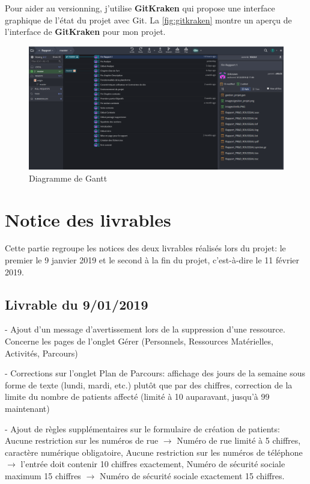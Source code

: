 \documentclass[noposter]{polytech/polytech}
\begin{document}
Pour aider au versionning, j'utilise \textbf{GitKraken} qui propose une interface graphique de l'état du projet avec Git. La \autoref{fig:gitkraken} montre un aperçu de l'interface de \textbf{GitKraken} pour mon projet.

\begin{figure}
	\includegraphics[scale=0.37]{images/gitkraken}
	\caption{Diagramme de Gantt}
	\label{fig:gitkraken}
\end{figure}

\chapter{Notice des livrables}

Cette partie regroupe les notices des deux livrables réalisés lors du projet: le premier le 9 janvier 2019 et le second à la fin du projet, c'est-à-dire le 11 février 2019.


\section{Livrable du 9/01/2019}

- Ajout d'un message d'avertissement lors de la suppression d'une ressource. Concerne les pages de l'onglet Gérer (Personnels, Ressources Matérielles, Activités, Parcours)

- Corrections sur l'onglet Plan de Parcours: affichage des jours de la semaine sous forme de texte (lundi, mardi, etc.) plutôt que par des chiffres, correction de la limite du nombre de patients affecté (limité à 10 auparavant, jusqu'à 99 maintenant)

- Ajout de règles supplémentaires sur le formulaire de création de patients: Aucune restriction sur les numéros de rue $\rightarrow$ Numéro de rue limité à 5 chiffres, caractère numérique obligatoire, Aucune restriction sur les numéros de téléphone $\rightarrow$ l'entrée doit contenir 10 chiffres exactement, Numéro de sécurité sociale maximum 15 chiffres $\rightarrow$ Numéro de sécurité sociale exactement 15 chiffres.
\end{document}
